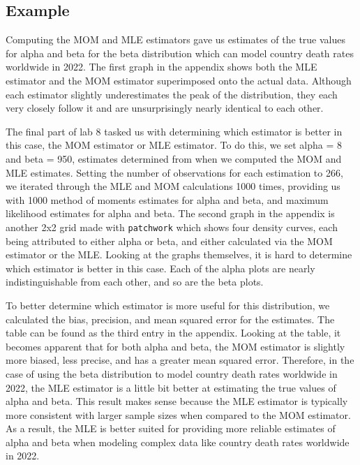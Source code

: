 \documentclass{article}\usepackage[]{graphicx}\usepackage[]{xcolor}
\begin{document}
\begin{multicols}{2}
\section{Example}
Computing the MOM and MLE estimators gave us estimates of the true values for alpha and beta for the beta distribution which can model country death rates worldwide in 2022. The first graph in the appendix shows both the MLE estimator and the MOM estimator superimposed onto the actual data. Although each estimator slightly underestimates the peak of the distribution, they each very closely follow it and are unsurprisingly nearly identical to each other. 

\indent
The final part of lab 8 tasked us with determining which estimator is better in this case, the MOM estimator or MLE estimator. To do this, we set alpha = 8 and beta = 950, estimates determined from when we computed the MOM and MLE estimates. Setting the number of observations for each estimation to 266, we iterated through the MLE and MOM calculations 1000 times, providing us with 1000 method of moments estimates for alpha and beta, and maximum likelihood estimates for alpha and beta. The second graph in the appendix is another 2x2 grid made with \texttt{patchwork} which shows four density curves, each being attributed to either alpha or beta, and either calculated via the MOM estimator or the MLE. Looking at the graphs themselves, it is hard to determine which estimator is better in this case. Each of the alpha plots are nearly indistinguishable from each other, and so are the beta plots.

\indent
To better determine which estimator is more useful for this distribution, we calculated the bias, precision, and mean squared error
for the estimates. The table can be found as the third entry in the appendix. Looking at the table, it becomes apparent that for both alpha and beta, the MOM estimator is slightly more biased, less precise, and has a greater mean squared error. Therefore, in the case of using the beta distribution to model country death rates worldwide in 2022, the MLE estimator is a little bit better at estimating the true values of alpha and beta. This result makes sense because the MLE estimator is typically more consistent with larger sample sizes when compared to the MOM estimator. As a result, the MLE is better suited for providing more reliable estimates of alpha and beta when modeling complex data like country death rates worldwide in 2022.



\vspace{2em}
\nocite{tidyverse}
\nocite{patchwork}
\nocite{cumstats}

\begin{tiny}

\end{tiny}
\end{multicols}
\end{document}
